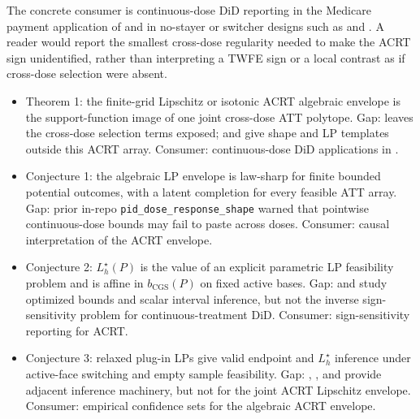 \documentclass[11pt]{article}
\theoremstyle{definition}
\theoremstyle{plain}
\theoremstyle{remark}
\begin{document}
The concrete consumer is continuous-dose DiD reporting in the Medicare payment
application of \citet{CallawayGoodmanBaconSantAnna2021} and in no-stayer or
switcher designs such as
\citet{deChaisemartinDHaultfoeuillePasquierSowVazquezBare2022} and
\citet{deChaisemartinDHaultfoeuilleVazquezBare2024}.  A reader would report
the smallest cross-dose regularity needed to make the ACRT sign unidentified,
rather than interpreting a TWFE sign or a local contrast as if cross-dose
selection were absent.

\begin{itemize}[leftmargin=*]
  \item Theorem 1: the finite-grid Lipschitz or isotonic ACRT algebraic envelope is the support-function image of one joint cross-dose ATT polytope. Gap: \citet{CallawayGoodmanBaconSantAnna2021} leaves the cross-dose selection terms exposed; \citet{ManskiPepper2000} and \citet{Voronin2025} give shape and LP templates outside this ACRT array. Consumer: continuous-dose DiD applications in \citet{CallawayGoodmanBaconSantAnna2021}.
  \item Conjecture 1: the algebraic LP envelope is law-sharp for finite bounded potential outcomes, with a latent completion for every feasible ATT array. Gap: prior in-repo \texttt{pid\_dose\_response\_shape} warned that pointwise continuous-dose bounds may fail to paste across doses. Consumer: causal interpretation of the ACRT envelope.
  \item Conjecture 2: \(L_h^\star(P)\) is the value of an explicit parametric LP feasibility problem and is affine in \(b_{\mathrm{CGS}}(P)\) on fixed active bases. Gap: \citet{ChernozhukovLeeRosen2013} and \citet{Stoye2020} study optimized bounds and scalar interval inference, but not the inverse sign-sensitivity problem for continuous-treatment DiD. Consumer: sign-sensitivity reporting for ACRT.
  \item Conjecture 3: relaxed plug-in LPs give valid endpoint and \(L_h^\star\) inference under active-face switching and empty sample feasibility. Gap: \citet{KaidoMolinariStoye2019}, \citet{BelloniBugniChernozhukov2018}, and \citet{Voronin2025} provide adjacent inference machinery, but not for the joint ACRT Lipschitz envelope. Consumer: empirical confidence sets for the algebraic ACRT envelope.
\end{itemize}
\end{document}
